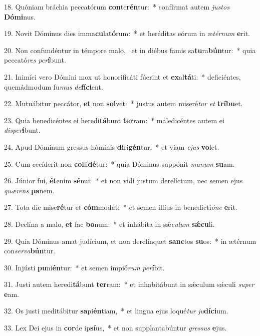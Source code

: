 18. Quóniam bráchia peccatórum \textbf{con}te\textbf{rén}tur:~*  confírmat autem \textit{jus}\textit{tos} \textbf{Dó}\textbf{mi}nus.\

19. Novit Dóminus dies imma\textbf{cu}la\textbf{tó}rum:~*  et heréditas eórum in æ\textit{tér}\textit{num} \textbf{e}rit.\

20. Non confundéntur in témpore malo, \dag\  et in diébus famis sa\textbf{tu}ra\textbf{bún}tur:~*  quia peccató\textit{res} \textit{per}\textbf{í}bunt.\

21. Inimíci vero Dómini mox ut honorificáti fúerint et \textbf{ex}al\textbf{tá}ti:~*  deficiéntes, quemádmodum fu\textit{mus} \textit{de}\textbf{fí}\textbf{ci}ent.\

22. Mutuábitur peccátor, \textbf{et} non \textbf{sol}vet:~*  justus autem miseré\textit{tur} \textit{et} \textbf{trí}\textbf{bu}et.\

23. Quia benedicéntes ei heredi\textbf{tá}bunt \textbf{ter}ram:~*  maledicéntes autem ei \textit{dis}\textit{per}\textbf{í}bunt.\

24. Apud Dóminum gressus hóminis \textbf{di}ri\textbf{gén}tur:~*  et viam \textit{e}\textit{jus} \textbf{vo}let.\

25. Cum cecíderit non \textbf{col}li\textbf{dé}tur:~*  quia Dóminus suppónit \textit{ma}\textit{num} \textbf{su}am.\

26. Júnior fui, \textbf{ét}enim \textbf{sé}nui:~*  et non vidi justum derelíctum, nec semen ejus \textit{quæ}\textit{rens} \textbf{pa}nem.\

27. Tota die mise\textbf{ré}tur et \textbf{cóm}modat:~*  et semen illíus in benedicti\textit{ó}\textit{ne} \textbf{e}rit.\

28. Declína a malo, \textbf{et} fac \textbf{bo}num:~*  et inhábita in sǽ\textit{cu}\textit{lum} \textbf{sǽ}\textbf{cu}li.\

29. Quia Dóminus amat judícium, et non derelínquet \textbf{sanc}tos \textbf{su}os:~*  in ætérnum con\textit{ser}\textit{va}\textbf{bún}tur.\

30. Injústi \textbf{pu}ni\textbf{én}tur:~*  et semen impió\textit{rum} \textit{per}\textbf{í}bit.\

31. Justi autem heredi\textbf{tá}bunt \textbf{ter}ram:~*  et inhabitábunt in sǽculum sǽculi \textit{su}\textit{per} \textbf{e}am.\

32. Os justi meditábitur \textbf{sa}pi\textbf{én}tiam,~*  et lingua ejus loqué\textit{tur} \textit{ju}\textbf{dí}\textbf{ci}um.\

33. Lex Dei ejus in \textbf{cor}de ip\textbf{sí}us,~*  et non supplantabúntur \textit{gres}\textit{sus} \textbf{e}jus.\

